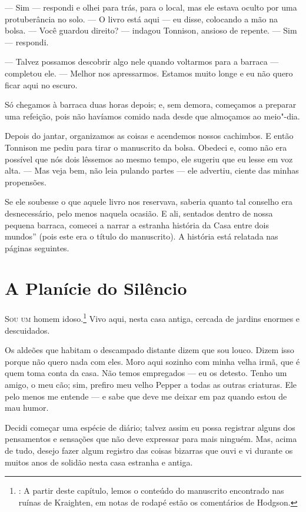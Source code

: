 --- Sim --- respondi e olhei para trás, para o local, mas ele estava oculto por uma protuberância no solo. --- O livro está
aqui ---  eu disse, colocando a mão na bolsa. --- Você guardou direito? --- indagou Tonnison, ansioso de repente.
--- Sim --- respondi.

--- Talvez possamos descobrir algo nele quando voltarmos para a barraca --- completou ele. --- Melhor nos
apressarmos. Estamos muito longe e eu não quero ficar aqui no escuro.

Só chegamos à barraca duas horas depois; e, sem demora, começamos a preparar uma refeição, pois não havíamos comido nada
desde que almoçamos ao meio"-dia.

Depois do jantar, organizamos as coisas e acendemos nossos cachimbos. E então Tonnison me pediu para tirar o manuscrito
da bolsa. Obedeci e, como não era possível que nós dois lêssemos ao mesmo tempo, ele sugeriu que eu lesse em voz alta.
--- Mas veja bem, não leia pulando partes --- ele advertiu, ciente das minhas propensões.

Se ele soubesse o que aquele livro nos reservava, saberia quanto tal conselho era desnecessário, pelo menos
naquela ocasião. E ali, sentados dentro de nossa pequena barraca, comecei a narrar a estranha história da
Casa entre dois mundos” (pois este era o título do manuscrito). A história está relatada nas páginas
seguintes. 


\clearpage

\chapter{A Planície do Silêncio}

\textsc{Sou um} homem idoso.\footnote{: A partir deste capítulo, lemos o conteúdo do manuscrito encontrado nas ruínas de Kraighten, em notas de rodapé estão os comentários de Hodgson.} Vivo aqui, nesta casa antiga, cercada de jardins enormes e descuidados.

Os aldeões que habitam o descampado distante dizem que sou louco. Dizem isso porque não quero nada com eles. Moro aqui
sozinho com minha velha irmã, que é quem toma conta da casa. Não temos empregados --- eu os detesto. Tenho um amigo, o
meu cão; sim, prefiro meu velho Pepper a todas as outras criaturas. Ele pelo menos me entende --- e sabe que deve me
deixar em paz quando estou de mau humor.

Decidi começar uma espécie de diário; talvez assim eu possa registrar alguns dos pensamentos e sensações que não deve
expressar para mais ninguém. Mas, acima de tudo, desejo fazer algum registro das coisas bizarras que ouvi e vi durante
os muitos anos de solidão nesta casa estranha e antiga.

